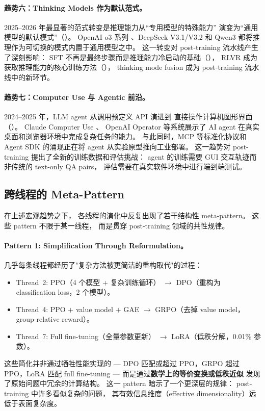 \paragraph{趋势六：Thinking Models 作为默认范式。}
2025--2026 年最显著的范式转变是推理能力从``专用模型的特殊能力''
演变为``通用模型的默认模式''（）。
OpenAI o3 系列 \cite{openai2025o3}、DeepSeek V3.1/V3.2 \cite{deepseek2025v32}
和 Qwen3 \cite{yang2025qwen3}
都将推理作为可切换的模式内置于通用模型之中。
这一转变对 post-training 流水线产生了深刻影响：
SFT 不再是最终步骤而是推理能力冷启动的基础（），
RLVR 成为获取推理能力的核心训练方法（），
thinking mode fusion 成为 post-training 流水线中的新环节。

\paragraph{趋势七：Computer Use 与 Agentic 前沿。}
2024--2025 年，LLM agent 从调用预定义 API 演进到
直接操作计算机图形界面（）。
Claude Computer Use \cite{anthropic2024computeruse}、
OpenAI Operator \cite{openai2025operator} 等系统展示了
AI agent 在真实桌面和浏览器环境中完成复杂任务的能力。
与此同时，MCP \cite{anthropic2024mcp} 等标准化协议和
Agent SDK 的涌现正在将 agent 从实验原型推向工业部署。
这一趋势对 post-training 提出了全新的训练数据和评估挑战：
agent 的训练需要 GUI 交互轨迹而非传统的 text-only QA pairs，
评估需要在真实软件环境中进行端到端测试。

\subsection{跨线程的 Meta-Pattern}
\label{sec:t8-meta}

在上述宏观趋势之下，
各线程的演化中反复出现了若干结构性 meta-pattern。
这些 pattern 不限于某一线程，
而是贯穿 post-training 领域的共性规律。

\paragraph{Pattern 1: Simplification Through Reformulation。}
几乎每条线程都经历了"复杂方法被更简洁的重构取代"的过程：
\begin{itemize}[leftmargin=2em]
  \item Thread~2: PPO（4 个模型 + 复杂训练循环）
    $\rightarrow$ DPO（重构为 classification loss，2 个模型）。
  \item Thread~4: PPO + value model + GAE
    $\rightarrow$ GRPO（去掉 value model，group-relative reward）。
  \item Thread~7: Full fine-tuning（全量参数更新）
    $\rightarrow$ LoRA（低秩分解，0.01\% 参数）。
\end{itemize}
这些简化并非通过牺牲性能实现的 ---
DPO 匹配或超过 PPO，GRPO 超过 PPO，LoRA 匹配 full fine-tuning ---
而是通过\textbf{数学上的等价变换或低秩近似}
发现了原始问题中冗余的计算结构。
这一 pattern 暗示了一个更深层的规律：
post-training 中许多看似复杂的问题，
其有效信息维度（effective dimensionality）远低于表面复杂度。

